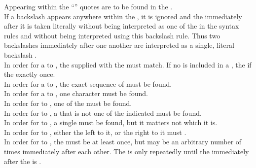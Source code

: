 {\setlength{\parindent}{0cm}
Appearing within the ``'' quotes are  to be found in the . \\

If a backslash appears anywhere within the , it is ignored and the  immediately after it is taken literally without being interpreted as one of the  in the syntax rules and without being interpreted using this backslash rule. Thus two backslashes immediately after one another are interpreted as a single, literal backslash . \\

In order for a  to , the  supplied with the  must match. If no  is included in a , the   if the   exactly once. \\

In order for a  to , the exact sequence of  must be found. \\

In order for a  to , one  character must be found. \\

In order for  to , one of the  must be found. \\

In order for  to , a  that is not one of the indicated  must be found. \\

In order for  to , a single  must be found, but it matters not which  it is. \\

In order for  to , either the  left to it, or the  right to it must . \\

In order for  to , the  must be  at least once, but may be  an arbitrary number of times immediately after each other. The  is only repeatedly  until the  immediately after the  is . \\

}
